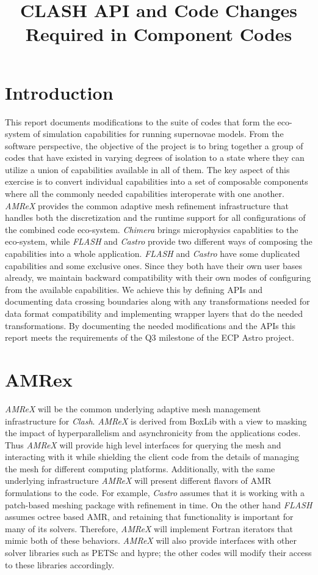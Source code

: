 \documentclass{article}
\title{CLASH API and Code Changes Required in
Component Codes}
\newcommand{\flash}{{\it FLASH}\xspace}
\newcommand{\amrex}{{\it AMReX}\xspace}
\newcommand{\castro}{{\it Castro}\xspace}
\newcommand{\clash}{{\it Clash}\xspace}
\newcommand{\chimera}{{\it Chimera}\xspace}
\begin{document}
\maketitle
\section{Introduction}
\label{sec:introduction}
This report documents modifications to the suite of codes that form
the eco-system of simulation capabilities for running supernovae
models. From the software perspective, the objective of the project is
to bring together a group of codes that have existed in varying
degrees of isolation to a state where they can utilize a union of
capabilities available in all of them. The key aspect of this exercise
is to convert individual capabilities into a set of composable
components where all the commonly needed capabilities interoperate
with one another. \amrex provides the common adaptive mesh refinement
infrastructure that handles both the discretization and the runtime
support for all configurations of the combined code eco-system. 
\chimera brings microphysics capablities to the eco-system, while
\flash and \castro provide two different ways of composing the
capabilities into a whole application. \flash and \castro have some
duplicated capabilities and some exclusive ones. Since they both have
their own user bases already, we maintain backward compatibility with
their own modes of configuring from the available capabilities. We
achieve this by defining APIs and documenting data crossing
boundaries along with any transformations needed for data format
compatibility and implementing wrapper layers that do the needed
transformations. By documenting the needed modifications and the APIs
this report meets the requirements of the Q3 milestone of the ECP
Astro project. 

\section{AMRex}
\label{sec:amrex}
\amrex  will be the common underlying adaptive mesh management
infrastructure for \clash. \amrex is derived from BoxLib \cite{boxlib}
with a view to masking the impact of hyperparallelism and
asynchronicity from the applications codes. Thus \amrex will
provide high level interfaces for querying the mesh and interacting
with it while shielding the client code from the details of managing
the mesh for different computing platforms. Additionally, with the
same underlying infrastructure \amrex will present different flavors
of AMR formulations to the code. For example, \castro assumes that it
is working with a patch-based meshing package with refinement in time.
On the other hand \flash assumes octree based AMR, and retaining that
functionality is important for many of its solvers. Therefore, \amrex
will implement Fortran iterators that mimic both of these
behaviors. \amrex will also provide interfaces with other solver
libraries such as PETSc and hypre; the other codes will modify their
access to these libraries accordingly. 
\end{document}

